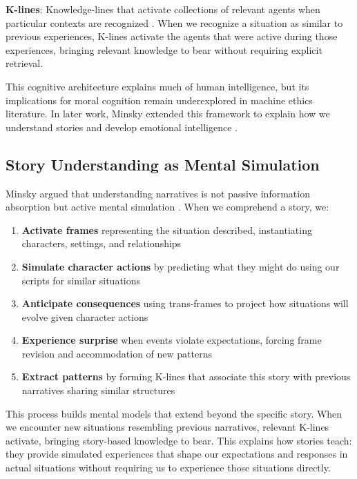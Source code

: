 \documentclass[12pt]{article}
\begin{document}
\textbf{K-lines}: Knowledge-lines that activate collections of relevant agents when particular contexts are recognized \citep{minsky1986society}. When we recognize a situation as similar to previous experiences, K-lines activate the agents that were active during those experiences, bringing relevant knowledge to bear without requiring explicit retrieval.

This cognitive architecture explains much of human intelligence, but its implications for moral cognition remain underexplored in machine ethics literature. In later work, Minsky extended this framework to explain how we understand stories and develop emotional intelligence \citep{minsky2006emotion}.

\subsection{Story Understanding as Mental Simulation}

Minsky argued that understanding narratives is not passive information absorption but active mental simulation \citep{minsky2006emotion}. When we comprehend a story, we:

\begin{enumerate}
\item \textbf{Activate frames} representing the situation described, instantiating characters, settings, and relationships
\item \textbf{Simulate character actions} by predicting what they might do using our scripts for similar situations
\item \textbf{Anticipate consequences} using trans-frames to project how situations will evolve given character actions
\item \textbf{Experience surprise} when events violate expectations, forcing frame revision and accommodation of new patterns
\item \textbf{Extract patterns} by forming K-lines that associate this story with previous narratives sharing similar structures
\end{enumerate}

This process builds mental models that extend beyond the specific story. When we encounter new situations resembling previous narratives, relevant K-lines activate, bringing story-based knowledge to bear. This explains how stories teach: they provide simulated experiences that shape our expectations and responses in actual situations without requiring us to experience those situations directly.
\end{document}

